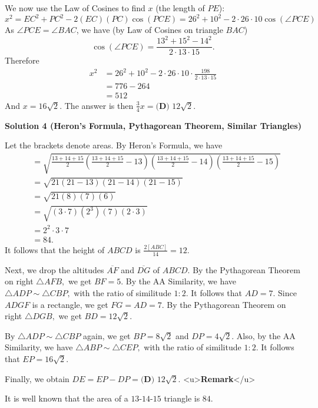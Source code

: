 \begin{enumerate}
 We now use the Law of Cosines to find $x$ (the length of $PE$):
 \[x^2 = EC^2 + PC^2 - 2(EC)(PC)\cos{(PCE)} = 26^2 + 10^2 - 2\cdot 26\cdot 10\cos(\angle PCE)\]As $\angle PCE = \angle BAC$, we have (by Law of Cosines on triangle $BAC$)
 \[\cos(\angle PCE) = \frac{13^2 + 15^2 - 14^2}{2\cdot 13\cdot 15}.\]Therefore
 \begin{align*} x^2 &= 26^2 + 10^2 - 2\cdot 26\cdot 10\cdot\frac{198}{2\cdot 13\cdot 15}\\ &= 776 - 264\\ &= 512 \end{align*}
And $x = 16\sqrt2$. The answer is then $\frac34x = \boxed{\textbf{(D) }12\sqrt2}$.

 



\textbf{Solution 4 (Heron's Formula, Pythagorean Theorem, Similar Triangles)}

Let the brackets denote areas. By Heron's Formula, we have
 \begin{align*} [ABC]&=\sqrt{\frac{13+14+15}{2}\left(\frac{13+14+15}{2}-13\right)\left(\frac{13+14+15}{2}-14\right)\left(\frac{13+14+15}{2}-15\right)} \\ &=\sqrt{21\left(21-13\right)\left(21-14\right)\left(21-15\right)} \\ &=\sqrt{21\left(8\right)\left(7\right)\left(6\right)} \\ &=\sqrt{\left(3\cdot7\right)\left(2^3\right)\left(7\right)\left(2\cdot3\right)} \\ &=2^2\cdot3\cdot7 \\ &=84. \end{align*}
It follows that the height of $ABCD$ is $\frac{2[ABC]}{14}=12.$

 Next, we drop the altitudes $\overline{AF}$ and $\overline{DG}$ of $ABCD.$ By the Pythagorean Theorem on right $\triangle AFB,$ we get $BF=5.$ By the AA Similarity, we have $\triangle ADP\sim\triangle CBP,$ with the ratio of similitude $1:2.$ It follows that $AD=7.$ Since $ADGF$ is a rectangle, we get $FG=AD=7.$ By the Pythagorean Theorem on right $\triangle DGB,$ we get $BD=12\sqrt2.$

 By $\triangle ADP\sim\triangle CBP$ again, we get $BP=8\sqrt2$ and $DP=4\sqrt2.$ Also, by the AA Similarity, we have $\triangle ABP\sim\triangle CEP,$ with the ratio of similitude $1:2.$ It follows that $EP=16\sqrt2.$

 Finally, we obtain $DE=EP-DP=\boxed{\textbf{(D) }12\sqrt2}.$
<u>\textbf{Remark}</u>

 It is well known that the area of a $13\text{-}14\text{-}15$ triangle is $84.$





\end{enumerate}

